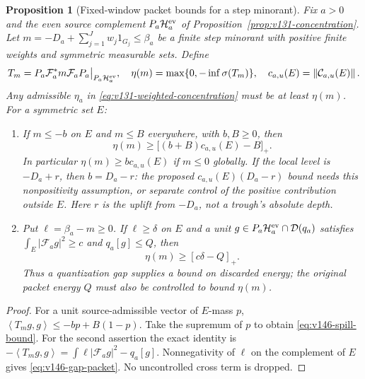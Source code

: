\documentclass[11pt]{article}
\newtheorem{proposition}[theorem]{Proposition}
\theoremstyle{remark}
\newcommand{\norm}[1]{\left\lVert #1\right\rVert}
\newcommand{\ip}[2]{\left\langle #1,#2\right\rangle}
\begin{document}
\begin{proposition}[Fixed-window packet bounds for a step minorant]
\label{prop:v146-packet-loss}
Fix $a>0$ and the even source complement
$P_a\mathcal H_a^{\rm ev}$ of Proposition~\ref{prop:v131-concentration}.
Let $m=-D_a+\sum_{j=1}^Jw_j1_{G_j}\le\beta_a$ be a finite step
minorant with positive finite weights and symmetric measurable sets.
Define
\[
 T_m=P_a\mathcal F_a^*m\mathcal F_aP_a\big|_{P_a\mathcal H_a^{\rm ev}},
 \quad \eta(m)=\max\{0,-\inf\sigma(T_m)\},\quad
 c_{a,u}(E)=\norm{\mathcal C_{a,u}(E)}.
\]
Any admissible $\eta_a$ in \eqref{eq:v131-weighted-concentration}
must be at least $\eta(m)$. For a symmetric set $E$:
\begin{enumerate}
\item If $m\le-b$ on $E$ and $m\le B$ everywhere, with $b,B\ge0$, then
\begin{equation}\label{eq:v146-spill-bound}
 \eta(m)\ge\bigl[(b+B)c_{a,u}(E)-B\bigr]_+.
\end{equation}
In particular $\eta(m)\ge b c_{a,u}(E)$ if $m\le0$ globally.
If the local level is $-D_a+r$, then $b=D_a-r$: the proposed
$c_{a,u}(E)(D_a-r)$ bound needs this nonpositivity assumption, or
separate control of the positive contribution outside $E$. Here $r$
is the uplift from $-D_a$, not a trough's absolute depth.
\item Put $\ell=\beta_a-m\ge0$. If $\ell\ge\delta$ on $E$ and a
unit $g\in P_a\mathcal H_a^{\rm ev}\cap\mathcal D(q_a)$ satisfies
$\int_E|\mathcal F_ag|^2\ge c$ and $q_a[g]\le Q$, then
\begin{equation}\label{eq:v146-gap-packet}
 \eta(m)\ge[c\delta-Q]_+.
\end{equation}
Thus a quantization gap supplies a bound on discarded energy; the
original packet energy $Q$ must also be controlled to bound $\eta(m)$.
\end{enumerate}
\end{proposition}
\begin{proof}
For a unit source-admissible vector of $E$-mass $p$,
$\ip{T_mg}g\le-bp+B(1-p)$. Take the supremum of $p$ to obtain
\eqref{eq:v146-spill-bound}. For the second assertion the exact identity
is $-\ip{T_mg}g=\int\ell|\mathcal F_ag|^2-q_a[g]$.
Nonnegativity of $\ell$ on the complement of $E$ gives
\eqref{eq:v146-gap-packet}. No uncontrolled cross term is dropped.
\end{proof}
\end{document}
